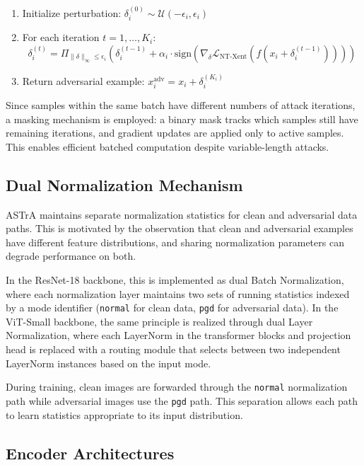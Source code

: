 \documentclass[conference]{IEEEtran}
\begin{document}
\begin{enumerate}
    \item Initialize perturbation: $\delta_i^{(0)} \sim \mathcal{U}(-\epsilon_i, \epsilon_i)$
    \item For each iteration $t = 1, \ldots, K_i$:
    \begin{equation}
    \delta_i^{(t)} = \Pi_{\|\delta\|_\infty \leq \epsilon_i} \left( \delta_i^{(t-1)} + \alpha_i \cdot \text{sign}(\nabla_\delta \mathcal{L}_{\text{NT-Xent}}(f(x_i + \delta_i^{(t-1)}))) \right)
    \end{equation}
    \item Return adversarial example: $x_i^{\text{adv}} = x_i + \delta_i^{(K_i)}$
\end{enumerate}

Since samples within the same batch have different numbers of attack iterations, a masking mechanism is employed: a binary mask tracks which samples still have remaining iterations, and gradient updates are applied only to active samples. This enables efficient batched computation despite variable-length attacks.

\subsection{Dual Normalization Mechanism}

ASTrA maintains separate normalization statistics for clean and adversarial data paths. This is motivated by the observation that clean and adversarial examples have different feature distributions, and sharing normalization parameters can degrade performance on both.

In the ResNet-18 backbone, this is implemented as dual Batch Normalization, where each normalization layer maintains two sets of running statistics indexed by a mode identifier (\texttt{normal} for clean data, \texttt{pgd} for adversarial data). In the ViT-Small backbone, the same principle is realized through dual Layer Normalization, where each LayerNorm in the transformer blocks and projection head is replaced with a routing module that selects between two independent LayerNorm instances based on the input mode.

During training, clean images are forwarded through the \texttt{normal} normalization path while adversarial images use the \texttt{pgd} path. This separation allows each path to learn statistics appropriate to its input distribution.

\subsection{Encoder Architectures}
\end{document}
